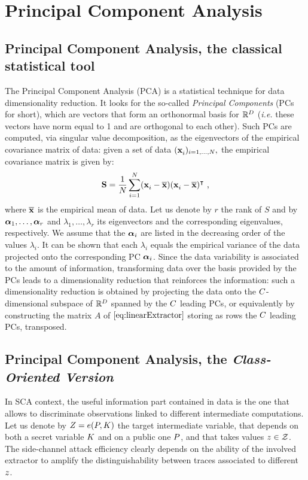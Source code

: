 \section{Principal Component Analysis}\label{sec:PCA}
%
%
\subsection{Principal Component Analysis, the classical statistical tool}
The Principal Component Analysis (PCA) \cite{fisher1938statistical} is a statistical technique for data dimensionality reduction. It looks for the so-called {\em Principal Components} (PCs for short), which are vectors that form an orthonormal basis for $\mathbb{R}^\traceLength$ (\textit{i.e.} these vectors have norm equal to 1 and are orthogonal to each other). Such PCs are computed, via singular value decomposition, as the eigenvectors of the empirical covariance matrix of data: given a set of data $(\sss[]{i})_{i=1,\dots,\numTraces[]},$ the empirical covariance matrix is given by:
\begin{equation}\label{eq:covmat}
\covmat = \frac{1}{\numTraces[]} \sum_{i=1}^{\numTraces[]}(\sss[]{i} - \mmmX)(\sss[]{i} - \mmmX)^\intercal \mbox{ ,}
\end{equation}
 where $\mmmX$ is the empirical mean of data. Let us denote by $r$ the rank of $S$ and by $\AAlpha_1, \dots, \AAlpha_r$ and $\lambda_1, \dots, \lambda_r$ its eigenvectors and the corresponding eigenvalues, respectively. We assume that the $\AAlpha_i$ are listed in the decreasing order of the values $\lambda_i$. It can be shown that each $\lambda_i$ equals the empirical variance of the data projected onto the corresponding PC $\AAlpha_i$. Since the data variability is associated to the amount of information, transforming data over the basis provided by the PCs leads to a dimensionality reduction that reinforces the information: such a dimensionality reduction is obtained by projecting the data onto the  $\newTraceLength$-dimensional subspace of $\mathbb{R}^\traceLength$ spanned by the $\newTraceLength$ leading PCs, or equivalently by constructing the matrix $A$ of $\eqref{eq:linearExtractor}$ storing as rows the $\newTraceLength$ leading PCs, transposed.\\

\subsection{Principal Component Analysis, the {\em Class-Oriented Version}}\label{sec:PCA_classes}
In SCA context, the useful information part contained in data is the one that allows to discriminate observations linked to different intermediate computations. Let us denote by $\sensRandVar = \targetFunction(\randPlaintext,\randKey)$ the target intermediate variable, that depends on both a secret variable $\randKey$ and on a public one $\randPlaintext$, and that takes values $\sensVar \in \sensVarSet$. The side-channel attack efficiency clearly depends on the ability of the involved extractor to amplify the distinguishability between traces associated to different $\sensVar$.\\

